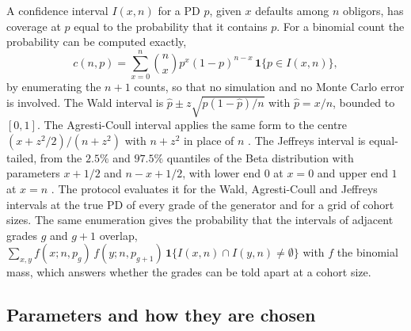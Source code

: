 A confidence interval $I(x,n)$ for a PD $p$, given $x$ defaults among $n$ obligors, has coverage at $p$ equal to the probability that it contains $p$. For a binomial count the probability can be computed exactly,
\begin{equation}
c(n,p)=\sum_{x=0}^{n}\binom{n}{x}p^{x}(1-p)^{n-x}\,\mathbf 1\{p\in I(x,n)\},
\label{eq:coverage}
\end{equation}
by enumerating the $n+1$ counts, so that no simulation and no Monte Carlo error is involved. The Wald interval is $\hat p\pm z\sqrt{\hat p(1-\hat p)/n}$ with $\hat p=x/n$, bounded to $[0,1]$. The Agresti-Coull interval applies the same form to the centre $(x+z^{2}/2)/(n+z^{2})$ with $n+z^{2}$ in place of $n$ \citep{Agresti_1998}. The Jeffreys interval is equal-tailed, from the $2.5\%$ and $97.5\%$ quantiles of the Beta distribution with parameters $x+1/2$ and $n-x+1/2$, with lower end $0$ at $x=0$ and upper end $1$ at $x=n$ \citep{Brown_2001}. The protocol evaluates it for the Wald, Agresti-Coull and Jeffreys intervals at the true PD of every grade of the generator and for a grid of cohort sizes. The same enumeration gives the probability that the intervals of adjacent grades $g$ and $g+1$ overlap, $\sum_{x,y}f(x;n,p_g)\,f(y;n,p_{g+1})\,\mathbf 1\{I(x,n)\cap I(y,n)\neq\emptyset\}$ with $f$ the binomial mass, which answers whether the grades can be told apart at a cohort size.

\subsection{Parameters and how they are chosen}
\label{sec:method-parameters}

